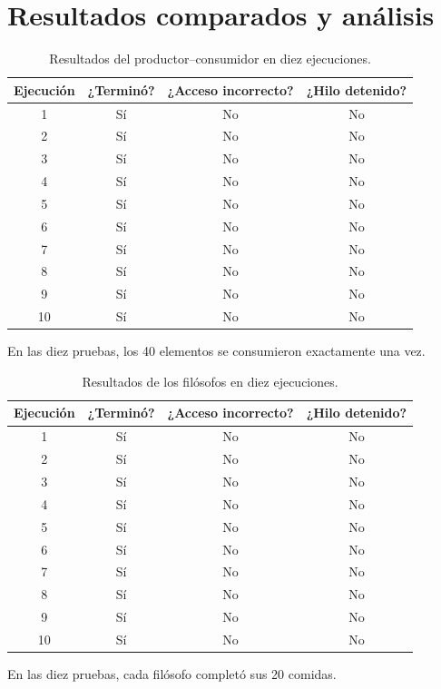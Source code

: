 \documentclass[12pt,oneside]{book}
\begin{document}
\chapter{Resultados comparados y análisis}
\begin{table}[H]\centering\footnotesize\setlength{\tabcolsep}{4pt}
\caption{Resultados del productor--consumidor en diez ejecuciones.}
\begin{tabular}{cccc}\toprule
Ejecución & ¿Terminó? & ¿Acceso incorrecto? & ¿Hilo detenido?\\\midrule
1 & Sí & No & No\\2 & Sí & No & No\\3 & Sí & No & No\\4 & Sí & No & No\\5 & Sí & No & No\\
6 & Sí & No & No\\7 & Sí & No & No\\8 & Sí & No & No\\9 & Sí & No & No\\10 & Sí & No & No\\\bottomrule
\end{tabular}

\medskip
En las diez pruebas, los 40 elementos se consumieron exactamente una vez.
\end{table}

\begin{table}[H]\centering\footnotesize\setlength{\tabcolsep}{4pt}
\caption{Resultados de los filósofos en diez ejecuciones.}
\begin{tabular}{cccc}\toprule
Ejecución & ¿Terminó? & ¿Acceso incorrecto? & ¿Hilo detenido?\\\midrule
1 & Sí & No & No\\2 & Sí & No & No\\3 & Sí & No & No\\4 & Sí & No & No\\5 & Sí & No & No\\
6 & Sí & No & No\\7 & Sí & No & No\\8 & Sí & No & No\\9 & Sí & No & No\\10 & Sí & No & No\\\bottomrule
\end{tabular}

\medskip
En las diez pruebas, cada filósofo completó sus 20 comidas.
\end{table}
\end{document}
